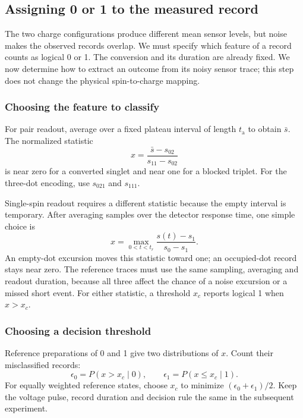 \subsection{Assigning 0 or 1 to the measured record}
\label{sec:calibration-record-classification}

The two charge configurations produce different mean sensor levels,
but noise makes the observed records overlap. We must specify
which feature of a record counts as logical 0 or 1.
The conversion and its duration are already fixed. We now determine
how to extract an outcome from its noisy sensor trace; this step
does not change the physical spin-to-charge mapping.

\subsubsection{Choosing the feature to classify}
For pair readout, average over a fixed plateau interval of length
$t_{\mathrm a}$ to obtain $\bar s$. The normalized statistic
\[
 x=\frac{\bar s-s_{02}}{s_{11}-s_{02}}
\]
is near zero for a converted singlet and near one for a blocked
triplet. For the three-dot encoding, use $s_{021}$ and $s_{111}$.

Single-spin readout requires a different statistic because the
empty interval is temporary. After averaging samples over the
detector response time, one simple choice is
\[
 x=\max_{0<t<t_r}\frac{s(t)-s_1}{s_0-s_1}.
\]
An empty-dot excursion moves this statistic toward one; an
occupied-dot record stays near zero. The reference traces must
use the same sampling, averaging and readout duration, because
all three affect the chance of a noise excursion or a missed
short event. For either statistic, a threshold $x_c$ reports
logical 1 when $x>x_c$.

\subsubsection{Choosing a decision threshold}
Reference preparations of 0 and 1 give two distributions of $x$.
Count their misclassified records:
\[
 \epsilon_0=P(x>x_c\mid0),\qquad
 \epsilon_1=P(x\le x_c\mid1).
\]
For equally weighted reference states, choose $x_c$ to minimize
$(\epsilon_0+\epsilon_1)/2$. Keep the voltage pulse, record duration
and decision rule the same in the subsequent experiment.

